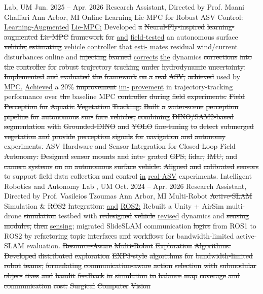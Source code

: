 \documentclass[10pt,letterpaper]{article}
\newcommand{\del}[1]{{\color{red}\sout{#1}}}
\newcommand{\add}[1]{{\color{blue}\uline{#1}}}
\begin{document}
Lab, UM Jun. 2025 -- Apr. 2026 Research Assistant, Directed by Prof. Maani Ghaffari Ann Arbor, MI  \del{Online} \del{Learning} \del{Lie-MPC} \del{for} \del{Robust} \del{ASV} \del{Control:} \add{Learning-Augmented} \add{Lie-MPC:} Developed \del{a} \del{Neural-Fly-inspired} \del{learning-augmented} \del{Lie-MPC} \del{framework} \del{for} \add{and} \add{field-tested} an autonomous surface \del{vehicle,} \del{estimating} \add{vehicle} \add{controller} \add{that} \add{esti-} \add{mates} residual wind/current disturbances online and \del{injecting} \del{learned} \add{corrects} \add{the} dynamics \del{corrections} \del{into} \del{the} \del{controller} \del{for} \del{robust} \del{trajectory} \del{tracking} \del{under} \del{hydrodynamic} \del{uncertainty.} \del{Implemented} \del{and} \del{evaluated} \del{the} \del{framework} \del{on} \del{a} \del{real} \del{ASV,} \del{achieved} \add{used} \add{by} \add{MPC.} \add{Achieved} a 20\% \del{improvement} \add{im-} \add{provement} in trajectory-tracking performance over \del{the} baseline MPC \del{controller} \del{during} \del{field} \del{experiments.} \del{} \del{Field} \del{Perception} \del{for} \del{Aquatic} \del{Vegetation} \del{Tracking:} \del{Built} \del{a} \del{water-scene} \del{perception} \del{pipeline} \del{for} \del{autonomous} \del{sur-} \del{face} \del{vehicles,} \del{combining} \del{DINO/SAM2-based} \del{segmentation} \del{with} \del{Grounded-DINO} \del{and} \del{YOLO} \del{fine-tuning} \del{to} \del{detect} \del{submerged} \del{vegetation} \del{and} \del{provide} \del{perception} \del{signals} \del{for} \del{navigation} \del{and} \del{autonomy} \del{experiments.} \del{} \del{ASV} \del{Hardware} \del{and} \del{Sensor} \del{Integration} \del{for} \del{Closed-Loop} \del{Field} \del{Autonomy:} \del{Designed} \del{sensor} \del{mounts} \del{and} \del{inte-} \del{grated} \del{GPS,} \del{lidar,} \del{IMU,} \del{and} \del{camera} \del{systems} \del{on} \del{an} \del{autonomous} \del{surface} \del{vehicle.} \del{Aligned} \del{and} \del{calibrated} \del{sensors} \del{to} \del{support} \del{field} \del{data} \del{collection} \del{and} \del{control} \add{in} \add{real-ASV} experiments. Intelligent Robotics and Autonomy Lab , UM Oct. 2024 -- Apr. 2026 Research Assistant, Directed by Prof. Vasileios Tzoumas Ann Arbor, MI  Multi-Robot \del{Active-SLAM} Simulation \del{\&} \del{ROS2} \del{Integration:} \add{and} \add{ROS2:} Rebuilt a Unity + AirSim multi-drone \del{simulation} testbed with \del{redesigned} \del{vehicle} \add{revised} dynamics and \del{sensing} \del{modules,} \del{then} \add{sensing;} migrated SlideSLAM communication \del{logics} from ROS1 to ROS2 \del{by} \del{refactoring} \del{topic} \del{interfaces} \del{and} \del{workflows} for bandwidth-limited active-SLAM evaluation. \del{} \del{Resource-Aware} \del{Multi-Robot} \del{Exploration} \del{Algorithms:} \del{Developed} \del{distributed} \del{exploration} \del{EXP3-style} \del{algorithms} \del{for} \del{bandwidth-limited} \del{robot} \del{teams,} \del{formulating} \del{communication-aware} \del{action} \del{selection} \del{with} \del{submodular} \del{objec-} \del{tives} \del{and} \del{bandit} \del{feedback} \del{in} \del{simulation} \del{to} \del{balance} \del{map} \del{coverage} \del{and} \del{communication} \del{cost.} \del{Surgical} \del{Computer} \del{Vision} 
\end{document}
